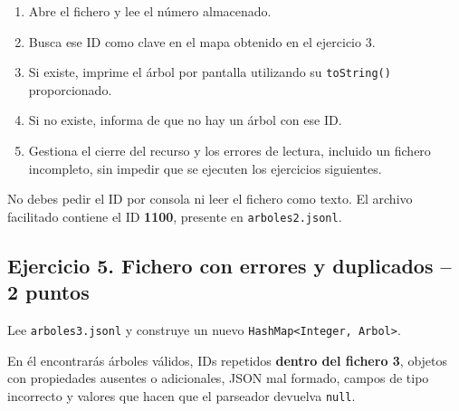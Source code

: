 \documentclass[a4paper,12pt]{article}
\begin{document}
\begin{enumerate}
\item Abre el fichero y lee el número almacenado.
\item Busca ese ID como clave en el mapa obtenido en el ejercicio 3.
\item Si existe, imprime el árbol por pantalla utilizando su \texttt{toString()} proporcionado.
\item Si no existe, informa de que no hay un árbol con ese ID.
\item Gestiona el cierre del recurso y los errores de lectura, incluido un fichero incompleto, sin impedir que se ejecuten los ejercicios siguientes.
\end{enumerate}

No debes pedir el ID por consola ni leer el fichero como texto. El archivo facilitado contiene el ID \textbf{1100}, presente en \texttt{arboles2.jsonl}.\par

\subsection*{\color{secondary}Ejercicio 5. Fichero con errores y duplicados  --  2 puntos}

Lee \texttt{arboles3.jsonl} y construye un nuevo \texttt{H\allowbreak{}a\allowbreak{}s\allowbreak{}h\allowbreak{}M\allowbreak{}a\allowbreak{}p\allowbreak{}<\allowbreak{}I\allowbreak{}n\allowbreak{}t\allowbreak{}e\allowbreak{}g\allowbreak{}e\allowbreak{}r\allowbreak{},\allowbreak{} \allowbreak{}A\allowbreak{}r\allowbreak{}b\allowbreak{}o\allowbreak{}l\allowbreak{}>}.\par

En él encontrarás árboles válidos, IDs repetidos \textbf{dentro del fichero 3}, objetos con propiedades ausentes o adicionales, JSON mal formado, campos de tipo incorrecto y valores que hacen que el parseador devuelva \texttt{null}.\par
\end{document}
